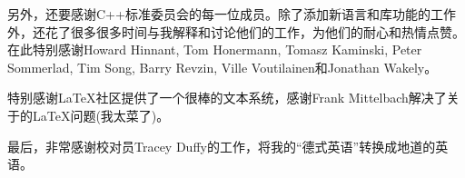 另外，还要感谢C++标准委员会的每一位成员。除了添加新语言和库功能的工作外，还花了很多很多时间与我解释和讨论他们的工作，为他们的耐心和热情点赞。在此特别感谢Howard Hinnant, Tom Honermann, Tomasz Kaminski, Peter Sommerlad, Tim Song, Barry Revzin, Ville Voutilainen和Jonathan Wakely。

特别感谢LaTeX社区提供了一个很棒的文本系统，感谢Frank Mittelbach解决了关于的\LaTeX{}问题(我太菜了)。

最后，非常感谢校对员Tracey Duffy的工作，将我的“德式英语”转换成地道的英语。


















